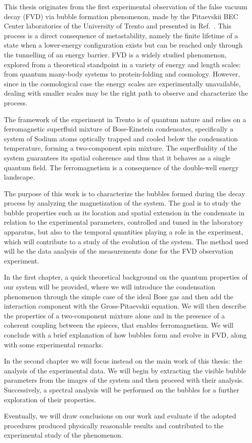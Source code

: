 This thesis originates from the first experimental observation of the false vacuum decay (FVD) via bubble formation phenomenon, made by the Pitaevskii BEC Center laboratories of the University of Trento and presented in Ref.\ \cite{zenesini2024false}. This process is a direct consequence of metastability, namely the finite lifetime of a state when a lower-energy configuration exists but can be reached only through the tunnelling of an energy barrier. FVD is a widely studied phenomenon, explored from a theoretical standpoint in a variety of energy and length scales: from quantum many-body systems to protein-folding and cosmology. However, since in the cosmological case the energy scales are experimentally unavailable, dealing with smaller scales may be the right path to observe and characterize the process.

The framework of the experiment in Trento is of quantum nature and relies on a ferromagnetic superfluid mixture of Bose-Einstein condensates, specifically a system of Sodium atoms optically trapped and cooled below the condensation temperature, forming a two-component spin mixture. The superfluidity of the system guarantees its spatial coherence and thus that it behaves as a single quantum field. The ferromagnetism is a consequence of the double-well energy landscape.

The purpose of this work is to characterize the bubbles formed during the decay process by analyzing the magnetization of the system. The goal is to study the bubble properties such as its location and spatial extension in the condensate in relation to the experimental parameters, controlled and tuned in the laboratory apparatus, but also to the temporal quantities playing a role in the experiment, which will contribute to a study of the evolution of the system. The method used will be the data analysis of the measurements done for the FVD observation experiment.

In the first chapter, a quick theoretical background on the quantum properties of our system will be provided, where we will introduce the condensation phenomenon through the simple case of the ideal Bose gas and then add the interaction component with the Gross-Pitaevskii equation. We will then describe the properties of a two-component mixture alone and in the presence of a coherent coupling between the spieces, that enables ferromagnetism. We will conclude with a brief explanation of how bubbles form and evolve in FVD, along with some experimental remarks.

In the second chapter we will focus instead on the main work of this thesis: the analysis of the experimental data. We will begin by extracting the visible bubble parameters from the images of the system and then proceed with their analysis. Successively, a spectral analysis will be performed on the bubbles for a further exploration of their properties.

Eventually, we will draw conclusions on our work and evaluate if the adopted procedures produced physically reasonable results and contributed to the experimental study of the phenomenon.